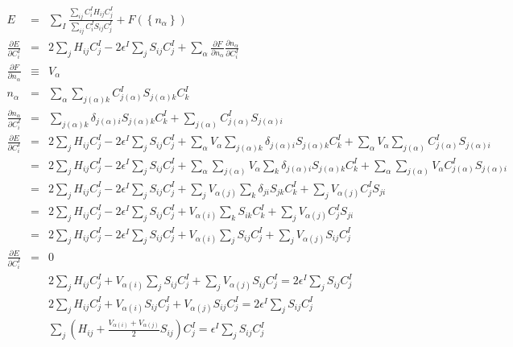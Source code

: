 \documentclass{article}
\begin{document}
\begin{eqnarray*}
E & = & \sum_I \frac{ \sum_{ij}{ C^I_i H_{ij} C^I_j}}{\sum_{ij} { C^I_i S_{ij} C^I_j} }  +
  F(\left\{ n_\alpha \right\} ) \\
\frac{\partial E}{\partial C^I_i} & = & 
  2 \sum_j H_{ij} C^I_j - 2 \epsilon^I \sum_j S_{ij} C^I_j +
  \sum_\alpha { \frac{\partial F}{\partial n_\alpha} \frac{\partial n_\alpha}{\partial C^I_i} } \\
\frac{\partial F}{\partial n_\alpha} & \equiv & V_\alpha \\
n_\alpha & = & \sum_\alpha \sum_{j(\alpha)k} C^I_{j(\alpha)} S_{j(\alpha)k} C^I_k \\
\frac{\partial n_\alpha}{\partial C^I_i} & = & 
  \sum_{j(\alpha)k} \delta_{j(\alpha)i} S_{j(\alpha)k} C^I_k + \sum_{j(\alpha)} C^I_{j(\alpha)} S_{j(\alpha)i} \\
\frac{\partial E}{\partial C^I_i} & = & 
  2 \sum_j H_{ij} C^I_j - 2 \epsilon^I \sum_j S_{ij} C^I_j +
  \sum_\alpha V_\alpha \sum_{j(\alpha)k} \delta_{j(\alpha)i} S_{j(\alpha)k} C^I_k +
  \sum_\alpha V_\alpha \sum_{j(\alpha)} C^I_{j(\alpha)} S_{j(\alpha)i} \\
& = &
  2 \sum_j H_{ij} C^I_j - 2 \epsilon^I \sum_j S_{ij} C^I_j +
  \sum_\alpha \sum_{j(\alpha)} V_\alpha \sum_{k} \delta_{j(\alpha)i} S_{j(\alpha)k} C^I_k +
  \sum_\alpha \sum_{j(\alpha)} V_\alpha C^I_{j(\alpha)} S_{j(\alpha)i} \\
& = &
  2 \sum_j H_{ij} C^I_j - 2 \epsilon^I \sum_j S_{ij} C^I_j +
  \sum_{j} V_{\alpha(j)} \sum_{k} \delta_{ji} S_{jk} C^I_k +
  \sum_{j} V_{\alpha(j)} C^I_{j} S_{ji} \\
& = &
  2 \sum_j H_{ij} C^I_j - 2 \epsilon^I \sum_j S_{ij} C^I_j +
  V_{\alpha(i)} \sum_{k} S_{ik} C^I_k +
  \sum_{j} V_{\alpha(j)} C^I_{j} S_{ji} \\
& = &
  2 \sum_j H_{ij} C^I_j - 2 \epsilon^I \sum_j S_{ij} C^I_j +
  V_{\alpha(i)} \sum_{j} S_{ij} C^I_j +
  \sum_{j} V_{\alpha(j)} S_{ij} C^I_{j} \\
\frac{\partial E}{\partial C^I_i} & = & 0 \\
&&
  2 \sum_j H_{ij} C^I_j + 
  V_{\alpha(i)} \sum_{j} S_{ij} C^I_j +
  \sum_{j} V_{\alpha(j)} S_{ij} C^I_{j} = 2 \epsilon^I \sum_j S_{ij} C^I_j \\
&& 
  2 \sum_j { H_{ij} C^I_j + 
  V_{\alpha(i)} S_{ij} C^I_j +
  V_{\alpha(j)} S_{ij} C^I_{j} } = 2 \epsilon^I \sum_j S_{ij} C^I_j \\
&& 
  \sum_j { \left( H_{ij} + 
    \frac{ V_{\alpha(i)}  + V_{\alpha(j)}   }{2} S_{ij} \right)  C^I_{j}}
    = \epsilon^I \sum_j S_{ij} C^I_j \\
\end{eqnarray*}
\end{document}
